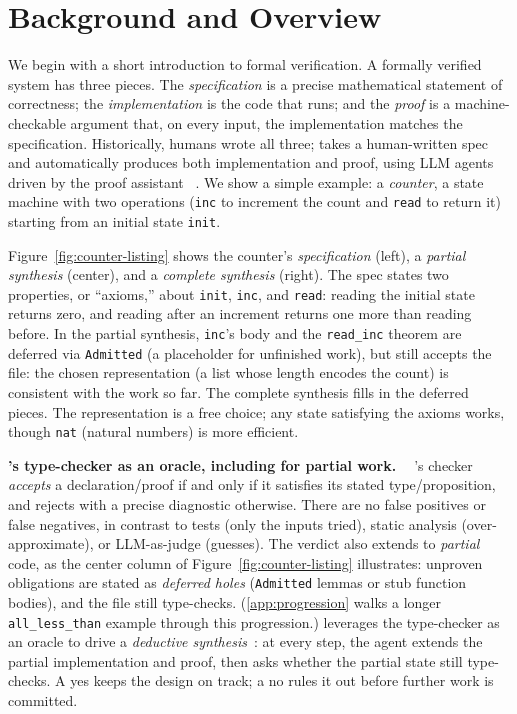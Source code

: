 \section{Background and Overview}
\label{sec:background}

We begin with a short introduction to formal verification.
A formally verified system has three pieces. The \emph{specification} is a precise mathematical statement of correctness; the \emph{implementation} is the code that runs; and the \emph{proof} is a machine-checkable argument that, on every input, the implementation matches the specification. Historically, humans wrote all three; \sys{} takes a human-written spec and automatically produces both implementation and proof, using LLM agents driven by the proof assistant \coq{}~\cite{coq}. We show a simple example: a \emph{counter}, a state machine with two operations (\texttt{inc} to increment the count and \texttt{read} to return it) starting from an initial state \texttt{init}.



Figure~\ref{fig:counter-listing} shows the counter's \textit{specification} (left), a \textit{partial synthesis} (center), and a \textit{complete synthesis} (right). The spec states two properties, or ``axioms,'' about \texttt{init}, \texttt{inc}, and \texttt{read}: reading the initial state returns zero, and reading after an increment returns one more than reading before. In the partial synthesis, \texttt{inc}'s body and the \texttt{read\_inc} theorem are deferred via \texttt{Admitted} (a placeholder for unfinished work), but \coq{} still accepts the file: the chosen representation (a list whose length encodes the count) is consistent with the work so far. The complete synthesis fills in the deferred pieces.
The representation is a free choice; any state satisfying the axioms works, though \texttt{nat} (natural numbers) is more efficient.


\textbf{\coq{}'s type-checker as an oracle, including for partial work. \ }
\coq{}'s checker \textit{accepts} a declaration/proof if and only if it satisfies its stated type/proposition, and rejects with a precise diagnostic otherwise. There are no false positives or false negatives, in contrast to tests (only the inputs tried), static analysis (over-approximate), or LLM-as-judge (guesses). The verdict also extends to \emph{partial} code, as the center column of Figure~\ref{fig:counter-listing} illustrates: unproven obligations are stated as \emph{deferred holes} (\texttt{Admitted} lemmas or stub function bodies), and the file still type-checks.
(\cref{app:progression} walks a longer \texttt{all\_less\_than} example through this progression.)
\sys{} leverages the type-checker as an oracle to drive a \emph{deductive synthesis}~\cite{manna-waldinger}: at every step, the agent extends the partial implementation and proof, then asks \coq{} whether the partial state still type-checks. A yes keeps the design on track; a no rules it out before further work is committed. 


